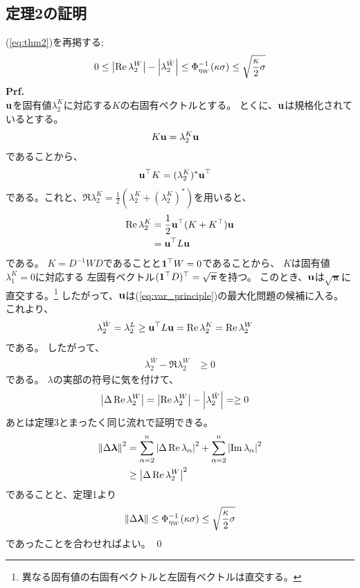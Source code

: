 \documentclass[a4paper,11pt]{jsarticle}
\numberwithin{equation}{section}
\begin{document}
\subsection{定理2の証明}
(\ref{eq:thm2})を再掲する;
\begin{align}
    0 \leq \abs{\Re \lambda_2^W} - \abs{\lambda_2^{\bar{W}}} \leq \Phi_{\eta_{W}}^{-1}(\kappa \sigma) \leq \sqrt{\frac{\kappa}{2} \sigma} \nonumber
\end{align}
\textbf{Prf.}\\
$\vb{u}$を固有値$\lambda_{2}^{K}$に対応する$K$の右固有ベクトルとする。
とくに、$\vb{u}$は規格化されているとする。
\begin{align}
    K \vb{u} &= \lambda_{2}^{K} \vb{u}
\end{align}
であることから、
\begin{align}
    \vb{u}^{\top} K  &=( \lambda_{2}^{K})^* \vb{u}^{\top}
\end{align}
である。これと、$\Re \lambda_{2}^{K} = \frac{1}{2} (\lambda_{2}^{K} + (\lambda_{2}^{K})^*)$を用いると、
\begin{align}
    \Re \lambda_{2}^{K} &= \frac{1}{2} \vb{u}^{\top} (K + K^{\top}) \vb{u}\\
    &= \vb{u}^{\top} L \vb{u}
\end{align}
である。
$K=D^{-1} W D$であることと$\vb{1}^{\top} W = 0$であることから、
$K$は固有値$\lambda_{1}^K = 0$に対応する
左固有ベクトル$(\vb{1}^{\top} D)^{\top} = \sqrt{\bm{\pi}}$を持つ。
このとき、$\vb{u}$は$\sqrt{\bm{\pi}}$に直交する。\footnote{異なる固有値の右固有ベクトルと左固有ベクトルは直交する。}
したがって、$\vb{u}$は(\ref{eq:var_principle})の最大化問題の候補に入る。
これより、
\begin{align}
    \lambda_{2}^{\bar{W}} = \lambda_{2}^{L} &\geq \vb{u}^{\top} L \vb{u} = \Re \lambda_{2}^{K} = \Re \lambda_{2}^{W}
\end{align}
である。
したがって、
\begin{align}
     \lambda_{2}^{\bar{W}} - \Re \lambda_{2}^{W} &\geq 0
\end{align}
である。
$\lambda$の実部の符号に気を付けて、
\begin{align}
    \abs{\Delta \Re \lambda_{2}^{W}} =  \abs{\Re \lambda_{2}^{W}} - \abs{\lambda_{2}^{\bar{W}}} &= \geq 0
\end{align}
あとは定理3とまったく同じ流れで証明できる。
\begin{align}
    \norm{\Delta \bm{\lambda}} ^2 &= \sum_{\alpha=2}^n \abs{\Delta \Re \lambda_{\alpha}}^2 + \sum_{\alpha=2}^n \abs{\Im \lambda_{\alpha}}^2\\
    &\geq \abs{\Delta \Re \lambda_{2}^{W}}^2
\end{align}
であることと、定理1より
\begin{align}
    \norm{\Delta \bm{\lambda}} \leq \Phi_{\eta_{W}}^{-1}(\kappa \sigma) \leq \sqrt{\frac{\kappa}{2} \sigma}
\end{align}
であったことを合わせればよい。
\qed
\end{document}
